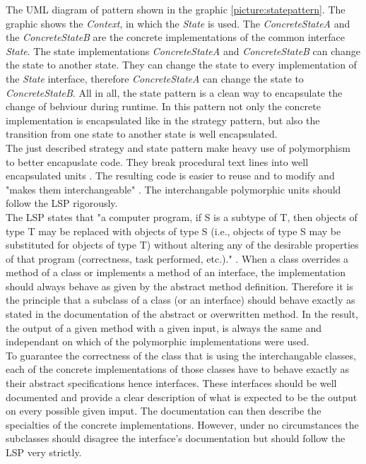 The \ac{UML} diagram of pattern shown in the graphic \ref{picture:statepattern}. The graphic shows the \textit{Context}, in which the \textit{State} is used. The \textit{ConcreteStateA} and the \textit{ConcreteStateB} are the concrete implementations of the common interface \textit{State}. The state implementations  \textit{ConcreteStateA} and \textit{ConcreteStateB} can change the state to another state. They can change the state to every implementation of the \textit{State} interface, therefore \textit{ConcreteStateA} can change the state to \textit{ConcreteStateB}.
All in all, the state pattern is a clean way to encapsulate the change of behviour during runtime. In this pattern not only the concrete implementation is encapsulated like in the strategy pattern, but also the transition from one state to another state is well encapsulated. 
\\

The just described strategy and state pattern make heavy use of polymorphism to better encapuslate code. They break procedural text lines into well encapsulated units \cite[p. 349]{gof}. The resulting code is easier to reuse and to modify and "makes them interchangeable" \cite[p. 21]{gof}. The interchangable polymorphic units should follow the \ac{LSP} rigorously.
\\

The \ac{LSP} states that "a computer program, if S is a subtype of T, then objects of type T may be replaced with objects of type S (i.e., objects of type S may be substituted for objects of type T) without altering any of the desirable properties of that program (correctness, task performed, etc.)." \cite[Liskov Substitution Principle]{wiki}. When a class overrides a method of a class or implements a method of an interface, the implementation should always behave as given by the abstract method definition. Therefore it is the principle that a subclass of a class (or an interface) should behave exactly as stated in the documentation of the abstract or overwritten method. In the result, the output of a given method with a given input, is always the same and independant on which of the polymorphic implementations were used. 
\\

 To guarantee the correctness of the class that is using the interchangable classes, each of the concrete implementations of those classes have to behave exactly as their abstract specifications hence interfaces. These interfaces should be well documented and provide a clear description of what is expected to be the output on every possible given imput. The documentation can then describe the specialties of the concrete implementations. However, under no circumstances the subclasses should disagree the interface's documentation but should follow the \ac{LSP} very strictly. 
 \\

